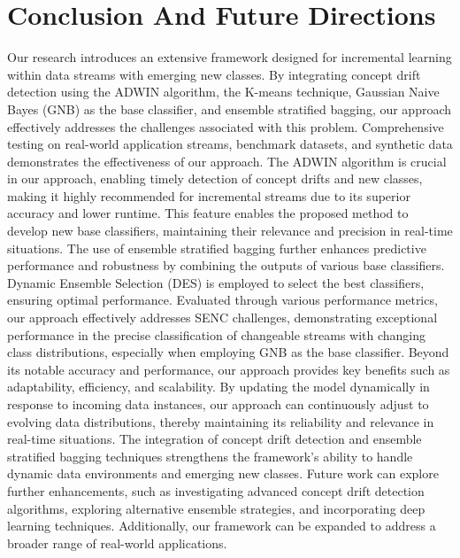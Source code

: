 \section{Conclusion And Future Directions}
\label{sec:5_8_Conclusions}
Our research introduces an extensive framework designed for incremental learning within data streams with emerging new classes. By integrating concept drift detection using the ADWIN algorithm, the K-means technique, Gaussian Naive Bayes (GNB) as the base classifier, and ensemble stratified bagging, our approach effectively addresses the challenges associated with this problem. Comprehensive testing on real-world application streams, benchmark datasets, and synthetic data demonstrates the effectiveness of our approach. The ADWIN algorithm is crucial in our approach, enabling timely detection of concept drifts and new classes, making it highly recommended for incremental streams due to its superior accuracy and lower runtime. This feature enables the proposed method to develop new base classifiers, maintaining their relevance and precision in real-time situations. The use of ensemble stratified bagging further enhances predictive performance and robustness by combining the outputs of various base classifiers. Dynamic Ensemble Selection (DES) is employed to select the best classifiers, ensuring optimal performance. Evaluated through various performance metrics, our approach effectively addresses SENC challenges, demonstrating exceptional performance in the precise classification of changeable streams with changing class distributions, especially when employing GNB as the base classifier. Beyond its notable accuracy and performance, our approach provides key benefits such as adaptability, efficiency, and scalability. By updating the model dynamically in response to incoming data instances, our approach can continuously adjust to evolving data distributions, thereby maintaining its reliability and relevance in real-time situations. The integration of concept drift detection and ensemble stratified bagging techniques strengthens the framework’s ability to handle dynamic data environments and emerging new classes. Future work can explore further enhancements, such as investigating advanced concept drift detection algorithms, exploring alternative ensemble strategies, and incorporating deep learning techniques. Additionally, our framework can be expanded to address a broader range of real-world applications.